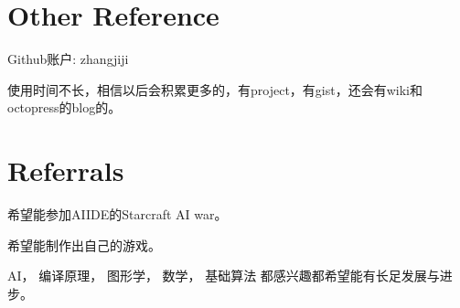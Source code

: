 \documentclass{article}
\begin{document}
\begin{CJK*}{UTF8}{gbsn}
\section{Other Reference}

Github账户: zhangjiji

使用时间不长，相信以后会积累更多的，有project，有gist，还会有wiki和octopress的blog的。

\section{Referrals}

希望能参加AIIDE的Starcraft AI war。

希望能制作出自己的游戏。

AI， 编译原理， 图形学， 数学， 基础算法 都感兴趣都希望能有长足发展与进步。

\end{CJK*}
\end{document}
